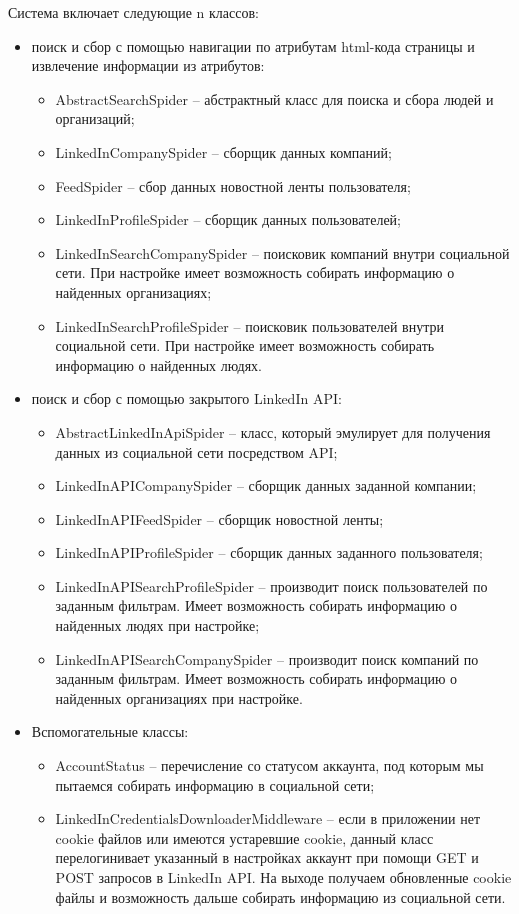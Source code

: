 Система включает следующие n классов:
\begin{itemize}
    \item поиск и сбор с помощью навигации по атрибутам html-кода страницы и извлечение информации из атрибутов:
    \begin{itemize}
        \item AbstractSearchSpider -- абстрактный класс для поиска и сбора людей и организаций;
        \item LinkedInCompanySpider -- сборщик данных компаний;
        \item FeedSpider -- сбор данных новостной ленты пользователя; 
        \item LinkedInProfileSpider -- сборщик данных пользователей;
        \item LinkedInSearchCompanySpider -- поисковик компаний внутри социальной сети. При настройке имеет возможность 
        собирать информацию о найденных организациях;
        \item LinkedInSearchProfileSpider -- поисковик пользователей внутри социальной сети. При настройке имеет возможность
        собирать информацию о найденных людях.
    \end{itemize}
    \item поиск и сбор с помощью закрытого LinkedIn API:
    \begin{itemize}
        \item AbstractLinkedInApiSpider -- класс, который эмулирует для получения данных из социальной сети посредством
        API;
        \item LinkedInAPICompanySpider -- сборщик данных заданной компании;
        \item LinkedInAPIFeedSpider -- сборщик новостной ленты;
        \item LinkedInAPIProfileSpider -- сборщик данных заданного пользователя;
        \item LinkedInAPISearchProfileSpider -- производит поиск пользователей по заданным фильтрам. Имеет возможность 
        собирать информацию о найденных людях при настройке;
        \item LinkedInAPISearchCompanySpider -- производит поиск компаний по заданным фильтрам. Имеет возможность 
        собирать информацию о найденных организациях при настройке.
    \end{itemize}
    \item Вспомогательные классы:
    \begin{itemize}
        \item AccountStatus -- перечисление со статусом аккаунта, под которым мы пытаемся собирать информацию в социальной
        сети;
        \item LinkedInCredentialsDownloaderMiddleware -- если в приложении нет cookie файлов или имеются устаревшие cookie, 
        данный класс перелогинивает указанный в настройках аккаунт при помощи GET и POST запросов в LinkedIn API. На выходе
        получаем обновленные cookie файлы и возможность дальше собирать информацию из социальной сети. 
    \end{itemize}  
\end{itemize}